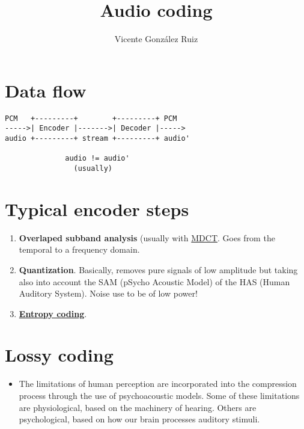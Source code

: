 
\title{Audio coding}

\author{Vicente González Ruiz}

\maketitle

\section{Data flow~\cite{sayood2017introduction}}

    \begin{verbatim}
PCM   +---------+        +---------+ PCM
----->| Encoder |------->| Decoder |----->
audio +---------+ stream +---------+ audio'

              audio != audio'
                (usually)
\end{verbatim}

\section{Typical encoder steps}
\begin{enumerate}
\def\labelenumi{\arabic{enumi}.}
\item
  \textbf{Overlaped subband analysis} (usually with
  \href{http://en.wikipedia.org/wiki/Modified_discrete_cosine_transform\%7D\%20(Modified\%20Discrete\%20Cosine\%20Transform)}{MDCT}.
  Goes from the temporal to a frequency domain.
\item
  \textbf{Quantization}. Basically, removes pure signals of low
  amplitude but taking also into account the SAM (pSycho Acoustic Model)
  of the HAS (Human Auditory System). Noise use to be of low power!
\item
  \href{https://vicente-gonzalez-ruiz.github.io/text_compression/}{\textbf{Entropy
  coding}}.
\end{enumerate}

\section{Lossy coding}
\begin{itemize}
\tightlist
\item
  The limitations of human perception are incorporated into the
  compression process through the use of psychoacoustic models. Some of
  these limitations are physiological, based on the machinery of
  hearing. Others are psychological, based on how our brain processes
  auditory stimuli.
\end{itemize}

